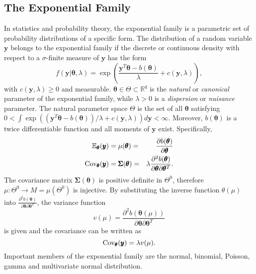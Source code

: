 \documentclass[12pt]{book}
\begin{document}
\subsection{The Exponential Family}
In statistics and probability theory, the exponential family is a parametric set of probability distributions of a specific form. The distribution of a random variable $\pmb{y}$ belongs to the exponential family if the discrete or continuous density with respect to a $\sigma$-finite measure of $\pmb{y}$ has the form
\begin{equation}
    f(\pmb{y}|\pmb{\theta}, \lambda)=\exp\left(\frac{\pmb{y}^T\pmb{\theta} - b(\pmb{\theta})}{\lambda}+c(\pmb{y},\lambda) \right),
\end{equation}
with $c(\pmb{y},\lambda)\geq 0$ and measurable. $\pmb{\theta}\in\Theta\subset\mathbb{R}^q$ is the \textit{natural} or \textit{canonical} parameter of the exponential family, while $\lambda > 0$ is a \textit{dispersion} or \textit{nuisance} parameter. The natural parameter space $\Theta$ is the set of all $\pmb{\theta}$ satisfying $0<\int\exp\left(\left(\pmb{y}^T\pmb{\theta} - b(\pmb{\theta})\right)/\lambda+c(\pmb{y},\lambda) \right)d\pmb{y}< \infty$. Moreover, $b(\pmb{\theta})$ is a twice differentiable  function and all moments of $\pmb{y}$ exist. Specifically, 
\begin{alignat}{3}
    \mathbb{E}_{\pmb{\theta}}(\pmb{y}) &= \mu(\pmb{\theta}) =& \frac{\partial b(\pmb{\theta})}{\partial\pmb{\theta}} \\
    \hbox{Cov}_{\pmb{\theta}}(\pmb{y}) &= \pmb{\Sigma}(\pmb{\theta}) =& \lambda\frac{\partial^2b(\pmb{\theta})}{\partial\pmb{\theta}\partial\pmb{\theta}^T}.
\end{alignat}
The covariance matrix $\pmb{\Sigma}(\pmb{\theta})$ is positive definite in $\Theta^0$, therefore $\mu:\Theta^0\rightarrow  M = \mu\left(\Theta^0\right)$ is injective. By substituting the inverse function $\theta(\mu)$ into $\frac{\partial^2b(\pmb{\theta})}{\partial\pmb{\theta}\partial\pmb{\theta}^T}$, the variance function 
\begin{equation}
    v(\mu)=\frac{\partial^2b(\pmb{\theta}(\mu))}{\partial\pmb{\theta}\partial\pmb{\theta}^T}
\end{equation}
is given and the covariance can be written as
\begin{equation}
    \hbox{Cov}_{\pmb{\theta}}(\pmb{y}) = \lambda v(\mu).
\end{equation}
Important members of the exponential family are the normal, binomial, Poisson, gamma and multivariate normal distribution\autocite[Cf.][]{fahrmeir2013multivariate}.
\end{document}
